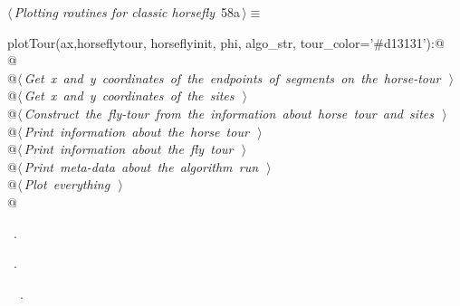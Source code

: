 \documentclass[11.5pt]{report}
\begin{document}
\begin{flushleft} \small\label{scrap83}\raggedright\small
{} $\langle\,${\itshape Plotting routines for classic horsefly}\nobreak\ {\footnotesize {58a}}$\,\rangle\equiv$
\vspace{-1ex}
\begin{list}{}{} \item
\mbox{}\verb@def plotTour(ax,horseflytour, horseflyinit, phi, algo_str, tour_color='#d13131'):@\\
\mbox{}\verb@   @\\
\mbox{}\verb@    @\hbox{$\langle\,${\itshape Get x and y coordinates of the endpoints of segments on the horse-tour}\nobreak\ {\footnotesize {}}$\,\rangle$}\verb@@\\
\mbox{}\verb@    @\hbox{$\langle\,${\itshape Get x and y coordinates of the sites}\nobreak\ {\footnotesize {}}$\,\rangle$}\verb@@\\
\mbox{}\verb@    @\hbox{$\langle\,${\itshape Construct the fly-tour from the information about horse tour and sites}\nobreak\ {\footnotesize {}}$\,\rangle$}\verb@@\\
\mbox{}\verb@    @\hbox{$\langle\,${\itshape Print information about the horse tour}\nobreak\ {\footnotesize {}}$\,\rangle$}\verb@@\\
\mbox{}\verb@    @\hbox{$\langle\,${\itshape Print information about the fly tour}\nobreak\ {\footnotesize {}}$\,\rangle$}\verb@@\\
\mbox{}\verb@    @\hbox{$\langle\,${\itshape Print meta-data about the algorithm run}\nobreak\ {\footnotesize {}}$\,\rangle$}\verb@@\\
\mbox{}\verb@    @\hbox{$\langle\,${\itshape Plot everything}\nobreak\ {\footnotesize {}}$\,\rangle$}\verb@@\\
\mbox{}\verb@    @{\NWsep}
\end{list}
\vspace{-1.5ex}
\footnotesize
\begin{list}{}{\setlength{\itemsep}{-\parsep}\setlength{\itemindent}{-\leftmargin}}
\item \NWtxtMacroDefBy\ .
\item \NWtxtMacroRefIn\ .
\item \NWtxtIdentsDefed\nobreak\  \verb@plotTour@\nobreak\ .
\item{}
\end{list}
\vspace{4ex}
\end{flushleft}
\end{document}
